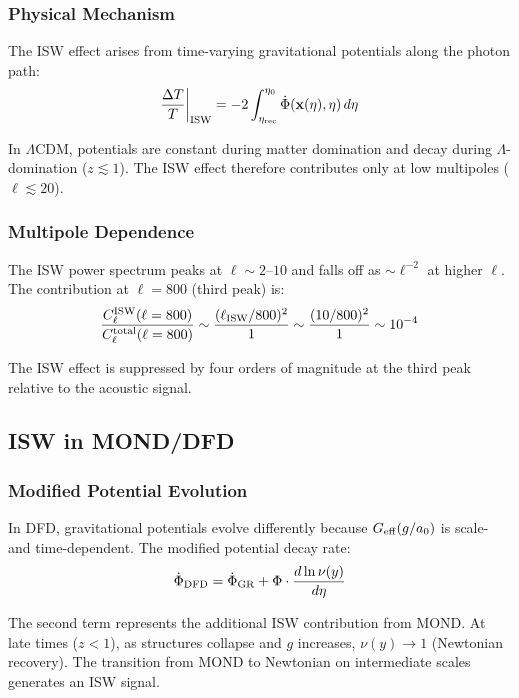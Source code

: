 \documentclass[11pt,a4paper]{article}
\begin{document}
\subsubsection{Physical Mechanism}

The ISW effect arises from time-varying gravitational potentials along the photon path:
\begin{equation}
\frac{\Delta T}{T}\bigg|_{\rm ISW} = -2\int_{\eta_{\rm rec}}^{\eta_0} \dot{\Phi}(\mathbf{x}(\eta), \eta)\,d\eta
\end{equation}

In $\Lambda$CDM, potentials are constant during matter domination and decay during $\Lambda$-domination ($z \lesssim 1$). The ISW effect therefore contributes only at low multipoles ($\ell \lesssim 20$).

\subsubsection{Multipole Dependence}

The ISW power spectrum peaks at $\ell \sim 2$--$10$ and falls off as $\sim \ell^{-2}$ at higher $\ell$. The contribution at $\ell = 800$ (third peak) is:
\begin{equation}
\frac{C_\ell^{\rm ISW}(\ell = 800)}{C_\ell^{\rm total}(\ell = 800)} \sim \frac{(\ell_{\rm ISW}/800)^2}{1} \sim \frac{(10/800)^2}{1} \sim 10^{-4}
\end{equation}

The ISW effect is suppressed by four orders of magnitude at the third peak relative to the acoustic signal.

\subsection{ISW in MOND/DFD}

\subsubsection{Modified Potential Evolution}

In DFD, gravitational potentials evolve differently because $G_{\rm eff}(g/a_0)$ is scale- and time-dependent. The modified potential decay rate:
\begin{equation}
\dot{\Phi}_{\rm DFD} = \dot{\Phi}_{\rm GR} + \Phi\cdot\frac{d\ln\nu(y)}{d\eta}
\end{equation}

The second term represents the additional ISW contribution from MOND. At late times ($z < 1$), as structures collapse and $g$ increases, $\nu(y) \to 1$ (Newtonian recovery). The transition from MOND to Newtonian on intermediate scales generates an ISW signal.
\end{document}

